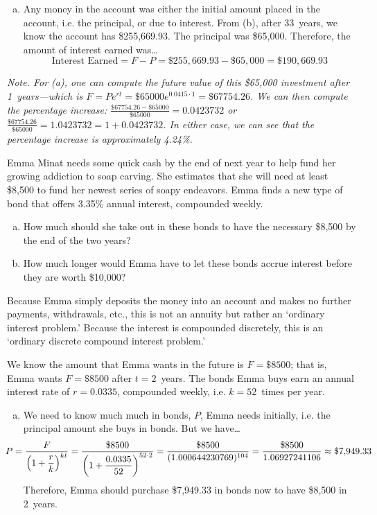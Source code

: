 \documentclass[12pt,letterpaper]{exam}
\begin{document}
\begin{questions}
\begin{enumerate}[(a)]
\item Any money in the account was either the initial amount placed in the account, i.e. the principal, or due to interest. From (b), after 33~years, we know the account has \$255,669.93. The principal was \$65,000. Therefore, the amount of interest earned was\dots
	\[
	\text{Interest Earned}= F - P= \$255,\!669.93 - \$65,\!000= \$190,\!669.93
	\]
\end{enumerate}

\vfill 

{\scriptsize\itshape Note. For (a), one can compute the future value of this \$65,000 investment after 1~years---which is $F= Pe^{rt}= \$65000 e^{0.0415 \cdot 1}= \$67754.26$. We can then compute the percentage increase: $\frac{\$67754.26 - \$65000}{\$65000}= 0.0423732$ or $\frac{\$67754.26}{\$65000}= 1.0423732= 1 + 0.0423732$. In either case, we can see that the percentage increase is approximately 4.24\%.}



\newpage
\question[15] Emma Minat needs some quick cash by the end of next year to help fund her growing addiction to soap carving. She estimates that she will need at least \$8,500 to fund her newest series of soapy endeavors. Emma finds a new type of bond that offers 3.35\% annual interest, compounded weekly. 
	\begin{enumerate}[(a)]
	\item How much should she take out in these bonds to have the necessary \$8,500 by the end of the two years?
	\item How much longer would Emma have to let these bonds accrue interest before they are worth \$10,000?
	\end{enumerate} \pspace

\sol Because Emma simply deposits the money into an account and makes no further payments, withdrawals, etc., this is not an annuity but rather an `ordinary interest problem.' Because the interest is compounded discretely, this is an `ordinary discrete compound interest problem.' \pspace

We know the amount that Emma wants in the future is $F= \$8500$; that is, Emma wants $F= \$8500$ after $t= 2$~years. The bonds Emma buys earn an annual interest rate of $r= 0.0335$, compounded weekly, i.e. $k= 52$~times per year. \pspace
 
\begin{enumerate}[(a)]
\item We need to know much much in bonds, $P$, Emma needs initially, i.e. the principal amount she buys in bonds. But we have\dots
	\[
	\hspace{-0.7cm} P= \dfrac{F}{\left(1 + \dfrac{r}{k} \right)^{kt}}= \dfrac{\$8500}{\left( 1 + \dfrac{0.0335}{52} \right)^{52 \cdot 2}}= \dfrac{\$8500}{(1.000644230769)^{104}}= \dfrac{\$8500}{1.06927241106} \approx \$7,\!949.33
	\]
Therefore, Emma should purchase \$7,949.33 in bonds now to have \$8,500 in 2~years. \pspace


\end{enumerate}
\end{questions}
\end{document}
